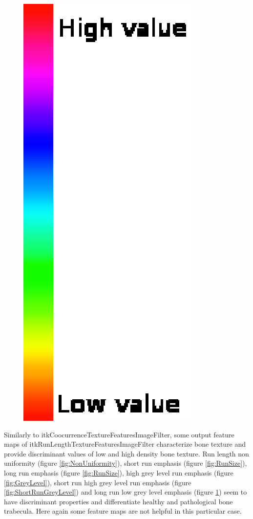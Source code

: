 \documentclass{InsightArticle}
\begin{document}
\begin{figure}[H]
\begin{center}
    \includegraphics[scale=0.32]{figures/discreteFullRainbow.eps}
    \label{fig:LongRunGreyLevel}
  \end{center}
\end{figure}

Similarly to itkCoocurrenceTextureFeaturesImageFilter, some output feature maps of itkRunLengthTextureFeaturesImageFilter characterize bone texture and provide discriminant values of low and high density bone texture. Run length non uniformity (figure \ref{fig:NonUniformity}), short run emphasis (figure \ref{fig:RunSize}), long run emphasis (figure \ref{fig:RunSize}), high grey level run emphasis (figure \ref{fig:GreyLevel}), short run high grey level run emphasis (figure \ref{fig:ShortRunGreyLevel}) and long run low grey level emphasis (figure \ref{fig:LongRunGreyLevel}) seem to have discriminant properties and differentiate healthy and pathological bone trabecula. Here again some feature maps are not helpful in this particular case.
\end{document}
